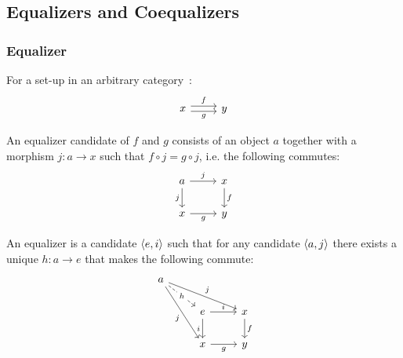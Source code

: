 \subsection{Equalizers and Coequalizers}

\subsubsection*{Equalizer}

\begin{definition}
  For a set-up in an arbitrary
  category~\parencite{leinster:basic_category_theory}:
  \[\begin{tikzcd}[ampersand replacement=\&]
    x \& y
    \arrow["f", shift left=1, from=1-1, to=1-2]
    \arrow["g"', shift right=1, from=1-1, to=1-2]
  \end{tikzcd}\]

  An equalizer candidate of $f$ and $g$ consists of an object $a$ together with
  a morphism $j:a\to x$ such that $f\circ j = g\circ j$, i.e. the following commutes:
  \[\begin{tikzcd}[ampersand replacement=\&]
    a \& x \\
    x \& y
    \arrow["f", from=1-2, to=2-2]
    \arrow["g"', from=2-1, to=2-2]
    \arrow["j"', from=1-1, to=2-1]
    \arrow["j", from=1-1, to=1-2]
  \end{tikzcd}\]

  An equalizer is a candidate $\langle e, i\rangle$ such that for any candidate $\langle a, j\rangle$
  there exists a unique $h:a\to e$ that makes the following commute:
  \[\begin{tikzcd}[ampersand replacement=\&]
    a \\
    \& e \& x \\
    \& x \& y
    \arrow["i"', from=2-2, to=3-2]
    \arrow["i", from=2-2, to=2-3]
    \arrow["f", from=2-3, to=3-3]
    \arrow["g"', from=3-2, to=3-3]
    \arrow["j"', from=1-1, to=3-2]
    \arrow["j", from=1-1, to=2-3]
    \arrow["h"{description}, dashed, from=1-1, to=2-2]
  \end{tikzcd}\]
\end{definition}


